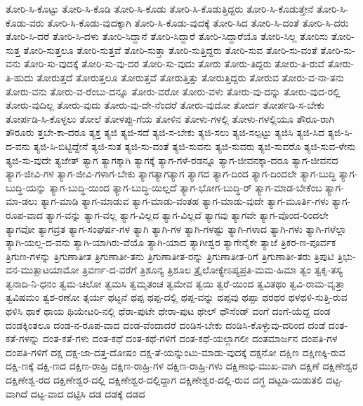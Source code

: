 {ತೋರಿ-ಸಿ-ಕೊಟ್ಟು
ತೋರಿ-ಸಿ-ಕೊಡಿ
ತೋರಿ-ಸಿ-ಕೊಡು
ತೋರಿ-ಸಿ-ಕೊಡುತ್ತಿದ್ದರು
ತೋರಿ-ಸಿ-ಕೊಡುತ್ತೇನೆ
ತೋರಿ-ಸಿ-ಕೊಡು-ವರು
ತೋರಿ-ಸಿ-ಕೊಡು-ವುದಕ್ಕಾಗಿ
ತೋರಿ-ಸಿ-ಕೊಡು-ವುದಕ್ಕೆ
ತೋರಿ-ಸಿದ
ತೋರಿ-ಸಿ-ದಂತೆ
ತೋರಿ-ಸಿ-ದರು
ತೋರಿ-ಸಿ-ದರೆ
ತೋರಿ-ಸಿ-ದಳು
ತೋರಿ-ಸಿದ್ದಾನೆ
ತೋರಿ-ಸಿದ್ದಾರೆ
ತೋರಿ-ಸಿದ್ದಾರೆಯೊ
ತೋರಿ-ಸಿಲ್ಲ
ತೋರಿಸು
ತೋರಿ-ಸುತ್ತ
ತೋರಿ-ಸುತ್ತಲೂ
ತೋರಿ-ಸುತ್ತವೆ
ತೋರಿ-ಸುತ್ತಾ
ತೋರಿ-ಸುತ್ತಿದ್ದರು
ತೋರಿ-ಸುವ
ತೋರಿ-ಸು-ವಂತೆ
ತೋರಿ-ಸು-ವನು
ತೋರಿ-ಸು-ವುದಕ್ಕೆ
ತೋರಿ-ಸು-ವು-ದರ
ತೋರಿ-ಸು-ವುದು
ತೋರು
ತೋರು-ತಿದ್ದರು
ತೋರು-ತಿ-ರುವೆ
ತೋರು-ತಿ-ಹುದು
ತೋರುತ್ತದೆ
ತೋರುತ್ತಲೂ
ತೋರುತ್ತವೆ
ತೋರುತ್ತಿತ್ತು
ತೋರುತ್ತಿದ್ದರು
ತೋರುವ
ತೋರು-ವ-ನಾ-ತನು
ತೋರು-ವನು
ತೋರು-ವ-ರೆಂಬು-ದನ್ನೂ
ತೋರು-ವರೋ
ತೋರು-ವಳು
ತೋರು-ವು-ದನ್ನು
ತೋರು-ವುದ-ರಲ್ಲಿ
ತೋರು-ವುದಿಲ್ಲ
ತೋರು-ವುದು
ತೋರು-ವು-ದೇ-ನೆಂದರೆ
ತೋರು-ವುದೋ
ತೋರ್ದ
ತೋರ್ಪಡಿ-ಸ-ಬೇಕು
ತೋರ್ಪಡಿ-ಸಿ-ಕೊಳ್ಳಲು
ತೋಲೆ
ತೋಳಪ್ಪು-ಗೆಯ
ತೋಳಿನ
ತೋಳು-ಗಳಲ್ಲಿ
ತೋಳು-ಗಳಲ್ಲಿಯೂ
ತೌರೂ-ರಾಗಿ
ತೌರೂರು
ತ್ತಬೇ-ಕಾ-ದರೂ
ತ್ಯಕ್ತ
ತ್ಯಜಿ
ತ್ಯಜಿ-ಸದೆ
ತ್ಯಜಿ-ಸ-ಬೇಕು
ತ್ಯಜಿ-ಸಲು
ತ್ಯಜಿ-ಸಲ್ಪಟ್ಟು
ತ್ಯಜಿಸಿ
ತ್ಯಜಿ-ಸಿದ
ತ್ಯಜಿ-ಸಿ-ದ-ವನು
ತ್ಯಜಿ-ಸಿ-ಬಿಟ್ಟಿದ್ದೇನೆ
ತ್ಯಜಿ-ಸುತ
ತ್ಯಜಿ-ಸು-ವಂತೆ
ತ್ಯಜಿ-ಸುವನು
ತ್ಯಜಿ-ಸುವರು
ತ್ಯಜಿ-ಸುವರೊ
ತ್ಯಜಿ-ಸುವ-ಳೇನು
ತ್ಯಜಿ-ಸು-ವುದೇ
ತ್ಯಜೇತ್
ತ್ಯಾಗ
ತ್ಯಾಗಕ್ಕಾಗಿ
ತ್ಯಾಗಕ್ಕೆ
ತ್ಯಾಗ-ಗಳೆ-ರಡನ್ನೂ
ತ್ಯಾಗ-ಜೀವನಕ್ಕಾ-ದರೂ
ತ್ಯಾಗ-ಜೀವನದ
ತ್ಯಾಗ-ಜೀವಿ-ಗಳ
ತ್ಯಾಗ-ಜೀವಿ-ಗಳಾಗ-ಬೇಕು
ತ್ಯಾಗತ್ಯಾಗತ್ಯಾಗ
ತ್ಯಾಗದ
ತ್ಯಾಗ-ದಿಂದ
ತ್ಯಾಗ-ದಿಂದಲೇ
ತ್ಯಾಗ-ಬುದ್ಧಿ
ತ್ಯಾಗ-ಬುದ್ಧಿ-ಯನ್ನು
ತ್ಯಾಗ-ಬುದ್ಧಿ-ಯಿಂದ
ತ್ಯಾಗ-ಬುದ್ಧಿ-ಯಿಲ್ಲದೆ
ತ್ಯಾಗ-ಭೋಗ-ಬುದ್ಧಿ-ರ್
ತ್ಯಾಗ-ಮಾಡ-ಬೇಕೆಂಬ
ತ್ಯಾಗ-ಮಾ-ಡಲು
ತ್ಯಾಗ-ಮಾಡಿ
ತ್ಯಾಗ-ಮಾಡುವ
ತ್ಯಾಗ-ಮಾಡು-ವಂತಹ
ತ್ಯಾಗ-ಮಾಡು-ವುದೇ
ತ್ಯಾಗ-ಮೂರ್ತಿ-ಗಳು
ತ್ಯಾಗ-ರೂಪ-ವಾದ
ತ್ಯಾಗ-ವನ್ನು
ತ್ಯಾಗ-ವಲ್ಲ
ತ್ಯಾಗ-ವಿಲ್ಲದ
ತ್ಯಾಗ-ವಿಲ್ಲದೆ
ತ್ಯಾಗವು
ತ್ಯಾಗವೇ
ತ್ಯಾಗ-ವೊಂದ-ರಿಂದಲೇ
ತ್ಯಾಗವೋ
ತ್ಯಾಗವ್ರತ
ತ್ಯಾಗ-ಸಂಘರ್ಷ-ಗಳ
ತ್ಯಾಗಿ
ತ್ಯಾಗಿ-ಗಳ
ತ್ಯಾಗಿ-ಗಳಷ್ಟು
ತ್ಯಾಗಿ-ಗಳಾದ
ತ್ಯಾಗಿ-ಗಳು
ತ್ಯಾಗಿ-ಗಳೆಲ್ಲಾ
ತ್ಯಾಗಿ-ಯಲ್ಲ-ದ-ವನು
ತ್ಯಾಗಿ-ಯಾಗಿರು-ವೆಯೊ
ತ್ಯಾಗಿ-ಯಾದ
ತ್ಯಾಗೀಶ್ವರ
ತ್ಯಾಗೇನೈಕೇ
ತ್ಯಾಜೆ
ತ್ರಿಕರ-ಣ-ಪೂರ್ವಕ
ತ್ರಿಗುಣ-ಗಳನ್ನು
ತ್ರಿಗುಣಾತೀತ
ತ್ರಿಗುಣಾತೀ-ತನು
ತ್ರಿಗುಣಾತೀತ-ರನ್ನು
ತ್ರಿಗುಣಾತೀತ-ರಿಗೆ
ತ್ರಿಗುಣಾತೀ-ತರು
ತ್ರಿಪುಟಿ
ತ್ರಿಭು-ವನ-ಮುತ್ಪಾಟಯಾಮೋ
ತ್ರಿವರ್ಣ-ದ-ವರೆಗೆ
ತ್ರಿಶೂನ್ಯ
ತ್ರಿಶೂಲ
ತ್ರೈಲೋಕ್ಯೇಽಪ್ಯಪ್ರತಿ-ಮಮ-ಹಿಮಾ
ತ್ವಂ
ತ್ವಕೃ-ತಸ್ಯ
ತ್ವನಾದಿ-ನಿ-ಧನಂ
ತ್ವಮ-ಚಲೋ
ತ್ವಮಸಿ
ತ್ವಮೃತಂಚ
ತ್ವಮೇವ
ತ್ವಯಿ
ತ್ವರೆ-ಯಿಂದ
ತ್ವವಿತಥಂ
ತ್ವವಿ-ರಾಮ-ವೃತ್ತಾ
ತ್ವವಿಷಮಂ
ತ್ವಶ-ರಣೋ
ತ್ಸರ್ಯ
ಥಟ್ಟನೆ
ಥಪ್ಪ
ಥಪ್ಪ-ದಲ್ಲಿ
ಥಪ್ಪ-ವನ್ನು
ಥಪ್ಪವು
ಥಪ್ಪಾ
ಥರಥರ
ಥಳಥಳಿ-ಸುತ್ತಿ-ರುವ
ಥಳಿಸಿ
ಥಾಕೆ
ಥಾಯ
ಥಿಯೇಟರಿ-ನಲ್ಲಿ
ಥೆರಾ-ಪುಟೇ
ಥೇರಾ-ಪುಟ
ಥೇಲ್
ಥೌಸೆಂಡ್
ದಂಗೆ
ದಂಗೆ-ಯೆದ್ದ
ದಂಡ
ದಂಡಕ್ಕಿಂತಲೂ
ದಂಡ-ನ-ರೂಪ-ವಾದ
ದಂಡ-ವೆಂದಾದರೆ
ದಂಡಿಸ-ಬೇಕು
ದಂಡಿಸಿ-ಕೊಳ್ಳುವು-ದರಿಂದ
ದಂಡೆ
ದಂತ-ಕತೆ-ಗಳನ್ನು
ದಂತ-ಕತೆ-ಗಳು
ದಂತ-ಕಥೆ
ದಂತ-ಕಥೆ-ಗಳಿಗೆ
ದಂತ-ಕಥೆ-ಯಲ್ಲಾಗಲೀ
ದಂತಮಾರ್ಜನ
ದಂಪತಿ-ಗಳ
ದಂಪತಿ-ಗಳಿಗೆ
ದಕ್ಷ
ದಕ್ಷ-ಜಾ-ದತ್ತ-ದೋಷಂ
ದಕ್ಷ-ತೆ-ಯನ್ನುಂಟು-ಮಾಡು-ವುದಕ್ಕೆ
ದಕ್ಷನೋ
ದಕ್ಷಿಣ
ದಕ್ಷಿಣಕ್ಕಿ-ರುವ
ದಕ್ಷಿ-ಣಕ್ಕೆ
ದಕ್ಷಿ-ಣದ
ದಕ್ಷಿಣ-ರಾಹ್ರಿ
ದಕ್ಷಿಣ-ರಾಹ್ರಿ-ಗಳ
ದಕ್ಷಿಣ-ರಾಹ್ರಿ-ಗಳು
ದಕ್ಷಿಣಾಭಿ-ಮುಖ-ವಾಗಿ
ದಕ್ಷಿಣೆ
ದಕ್ಷಿಣೇಶ್ವರ
ದಕ್ಷಿಣೇಶ್ವ-ರದ
ದಕ್ಷಿಣೇಶ್ವರ-ದಲ್ಲಿ
ದಕ್ಷಿಣೇಶ್ವರ-ದಲ್ಲಿದ್ದಾಗ
ದಕ್ಷಿಣೇಶ್ವರ-ದಲ್ಲಿ-ರುವ
ದಗ್ಧ
ದಟ್ಟಡಿ-ಯಿಡುತಲಿ
ದಟ್ಟ-ವಾಗಿದೆ
ದಟ್ಟ-ವಾದ
ದಟ್ಟಿಸಿ
ದಡ
ದಡಕ್ಕೆ
ದಡದ
}
